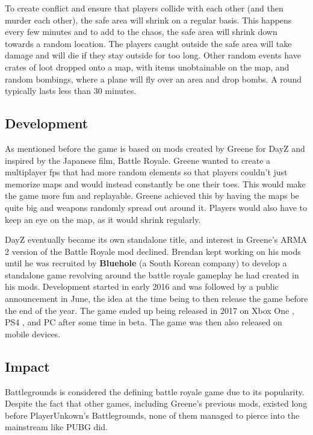 \documentclass[a4paper,10pt]{book}
\begin{document}
        To create conflict and ensure that players collide with each other (and then murder each other), the safe area will shrink on a regular basis. This happens every few minutes and to add to the chaos, the safe area will shrink down towards a random location. The players caught outside the safe area will take damage and will die if they stay outside for too long. Other random events have crates of loot dropped onto a map, with items unobtainable on the map, and random bombings, where a plane will fly over an area and drop bombs. A round typically lasts less than 30 minutes.
       
 \subsection{Development }
 
        As mentioned before the game is based on mods created by Greene for DayZ and inspired by the Japanese film, Battle Royale. Greene wanted to create a multiplayer fps that had more random elements so that players couldn't just memorize maps and would instead constantly be one their toes. This would make the game more fun and replayable. Greene achieved this by having the maps be quite big and weapons randomly spread out around it. Players would also have to keep an eye on the map, as it would shrink regularly.
       
 
        DayZ eventually became its own standalone title, and interest in Greene's ARMA 2 version of the Battle Royale mod declined. Brendan kept working on his mods until he was recruited by  \textbf{Bluehole }  (a South Korean company) to develop a standalone game revolving around the battle royale gameplay he had created in his mods. Development started in early 2016 and was followed by a public announcement in June, the idea at the time being to then release the game before the end of the year. The game ended up being released in 2017 on  Xbox One ,  PS4 , and PC after some time in beta. The game was then also released on mobile devices.
       
 \subsection{Impact }
 
        Battlegrounds is considered the defining battle royale game due to its popularity. Despite the fact that other games, including Greene's previous mods, existed long before PlayerUnkown's Battlegrounds, none of them managed to pierce into the mainstream like PUBG did.
       
\end{document}
